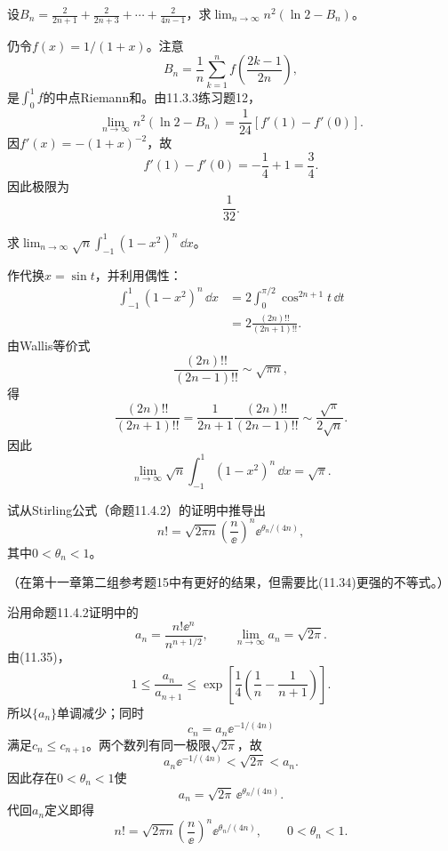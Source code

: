 \begin{xexercise}[5]
设$B_n=\frac2{2n+1}+\frac2{2n+3}+\cdots+\frac2{4n-1}$，求$\displaystyle\lim_{n\to\infty}n^2(\ln2-B_n)$。
\end{xexercise}
\begin{xsolution}
仍令$f(x)=1/(1+x)$。注意
\[
 B_n=\frac1n\sum_{k=1}^n
 f\left(\frac{2k-1}{2n}\right),
\]
是$\int_0^1f$的中点Riemann和。由11.3.3练习题12，
\[
 \lim_{n\to\infty}n^2(\ln2-B_n)
 =\frac1{24}[f'(1)-f'(0)].
\]
因$f'(x)=-(1+x)^{-2}$，故
\[
 f'(1)-f'(0)=-\frac14+1=\frac34.
\]
因此极限为
\[
 \boxed{\frac1{32}}.
\]
\end{xsolution}


\begin{xexercise}[6]
求$\displaystyle\lim_{n\to\infty}\sqrt n\int_{-1}^1(1-x^2)^n\,\dd x$。
\end{xexercise}
\begin{xsolution}
作代换$x=\sin t$，并利用偶性：
\begin{align*}
\int_{-1}^1(1-x^2)^n\,\dd x
&=2\int_0^{\pi/2}\cos^{2n+1}t\,\dd t\\
&=2\frac{(2n)!!}{(2n+1)!!}.
\end{align*}
由Wallis等价式
\[
 \frac{(2n)!!}{(2n-1)!!}\sim\sqrt{\pi n},
\]
得
\[
 \frac{(2n)!!}{(2n+1)!!}
 =\frac1{2n+1}\frac{(2n)!!}{(2n-1)!!}
 \sim\frac{\sqrt\pi}{2\sqrt n}.
\]
因此
\[
 \boxed{\lim_{n\to\infty}\sqrt n
 \int_{-1}^1(1-x^2)^n\,\dd x=\sqrt\pi}.
\]
\end{xsolution}


\begin{xexercise}[7]
试从Stirling公式（命题11.4.2）的证明中推导出
  \[
    n!=\sqrt{2\pi n}\left(\frac n\ee\right)^n\ee^{\theta_n/(4n)},
  \]
  其中$0<\theta_n<1$。

  （在第十一章第二组参考题15中有更好的结果，但需要比(11.34)更强的不等式。）
\end{xexercise}
\begin{xsolution}
沿用命题11.4.2证明中的
\[
 a_n=\frac{n!\ee^n}{n^{n+1/2}},
 \qquad \lim_{n\to\infty}a_n=\sqrt{2\pi}.
\]
由(11.35)，
\[
 1\le\frac{a_n}{a_{n+1}}
 \le\exp\left[\frac14\left(\frac1n-\frac1{n+1}\right)\right].
\]
所以$\{a_n\}$单调减少；同时
\[
 c_n=a_n\ee^{-1/(4n)}
\]
满足$c_n\le c_{n+1}$。两个数列有同一极限$\sqrt{2\pi}$，故
\[
 a_n\ee^{-1/(4n)}<\sqrt{2\pi}<a_n.
\]
因此存在$0<\theta_n<1$使
\[
 a_n=\sqrt{2\pi}\,\ee^{\theta_n/(4n)}.
\]
代回$a_n$定义即得
\[
 \boxed{
 n!=\sqrt{2\pi n}\left(\frac n\ee\right)^n
 \ee^{\theta_n/(4n)},\qquad 0<\theta_n<1}.
\]
\end{xsolution}


